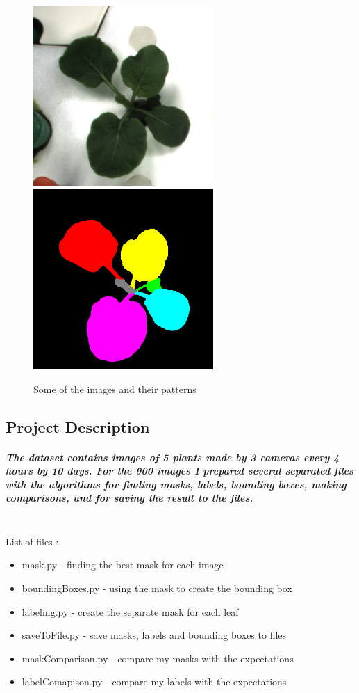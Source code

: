 \documentclass[12pt]{article}
\begin{document}
\begin{center}
\begin{figure}[H]
\centering
\includegraphics[width = 2.7in]{rgb_01_00_009_05.png}
\hspace{1cm}
\includegraphics[width = 2.7in]{label_01_00_009_05.png}
\caption{
Some of the images and their patterns
}
\end{figure}
\end{center}


\subsection{Project Description}

\subparagraph{
The dataset contains images of 5 plants made by 3 cameras every 4 hours by 10 days. For the 900 images I prepared several separated files with the algorithms for finding masks, labels, bounding boxes, making comparisons, and for saving the result to the files.\\\\
}

List of files :
\begin{itemize}
\item mask.py - finding the best mask for each image
\item boundingBoxes.py - using the mask to create the bounding box
\item labeling.py - create the separate mask for each leaf
\item saveToFile.py - save masks, labels and bounding boxes to files
\item maskComparison.py - compare my masks with the expectations
\item labelComapison.py - compare my labels with the expectations
\end{itemize}
\end{document}
